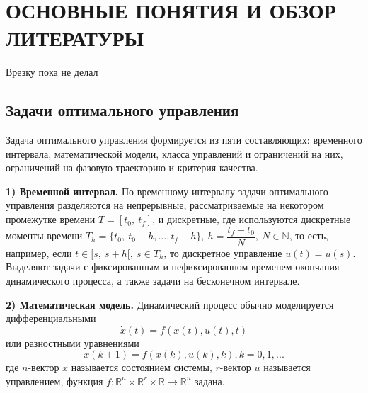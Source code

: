 \chapter{ОСНОВНЫЕ ПОНЯТИЯ И ОБЗОР ЛИТЕРАТУРЫ }\label{chap1}

\bigskip
Врезку пока не делал
\bigskip
%

\section{Задачи оптимального управления}\label{1sec:optimal-control}
Задача оптимального управления формируется из пяти составляющих: временного интервала, математической модели, класса управлений и ограничений на них, ограничений на фазовую траекторию и критерия качества.


\textbf{1) Временной интервал.} По временному интервалу задачи оптимального управления разделяются на непрерывные, рассматриваемые на некотором промежутке времени $T = [t_0,~ t_f]$, и дискретные, где используются дискретные моменты времени $T_h = \{t_0,~ t_0 + h, \ldots , t_f - h \}, ~h = \dfrac{t_f-t_0}{N}, ~N \in \mathbb{N}$, то есть, например, если $t \in [s,~s+h[ ,~s \in T_h$, то дискретное управление $ u(t) = u(s) $.
Выделяют задачи с фиксированным и нефиксированном временем окончания динамического процесса, а также задачи на бесконечном интервале.


\textbf{2) Математическая модель.} Динамический процесс обычно моделируется дифференциальными
\[ \dot x(t) = f(x(t), u(t), t) \]
или разностными уравнениями
\[ x(k + 1) = f(x(k), u(k), k), k = 0, 1, ...\]
где $n$-вектор $x$ называется состоянием системы, $r$-вектор $u$ называется управлением, функция $f : \mathbb{R}^n \times \mathbb{R}^r \times \mathbb{R} \to \mathbb{R}^n$ задана.


